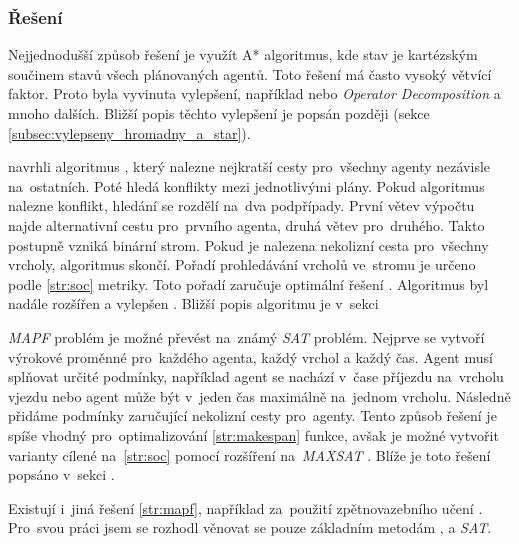 \subsubsection{Řešení~}\label{subsubsec:reseni_offline_mapf}



Nejjednodušší způsob řešení je využít A* algoritmus, kde stav je kartézským součinem stavů všech plánovaných agentů.
Toto řešení má často vysoký větvící faktor.
Proto byla vyvinuta vylepšení, například  nebo
\emph{Operator Decomposition} \citep{Standley_2010} a mnoho dalších.
Bližší popis těchto vylepšení je popsán později (sekce \ref{subsec:vylepseny_hromadny_a_star}).

\citet*{Sharon} navrhli algoritmus ,
který nalezne nejkratší cesty pro~všechny agenty nezávisle na~ostatních.
Poté hledá konflikty mezi jednotlivými plány.
Pokud algoritmus nalezne konflikt, hledání se rozdělí na~dva podpřípady.
První větev výpočtu najde alternativní cestu pro~prvního agenta, druhá větev pro~druhého.
Takto postupně vzniká binární strom.
Pokud je nalezena nekolizní cesta pro~všechny vrcholy, algoritmus skončí.
Pořadí prohledávání vrcholů ve~stromu je určeno podle \ref{str:soc} metriky.
Toto pořadí zaručuje optimální řešení \citep{Sharon}.
Algoritmus byl nadále rozšířen a vylepšen \citep{Boyarski}.
Bližší popis algoritmu je v~sekci 

\emph{MAPF} problém je možné převést na~známý \emph{SAT} problém.  %
Nejprve se vytvoří výrokové proměnné pro~každého agenta, každý vrchol a každý čas.
Agent musí splňovat určité podmínky, například agent se nachází v~čase příjezdu na~vrcholu vjezdu
nebo agent může být v~jeden čas maximálně na~jednom vrcholu.
Následně přidáme podmínky zaručující nekolizní cesty pro~agenty.
Tento způsob řešení je spíše vhodný pro~optimalizování \ref{str:makespan} funkce,
avšak je možné vytvořit varianty cílené na~\ref{str:soc} pomocí rozšíření na~\emph{MAXSAT} \citep{bartak}.
Blíže je toto řešení popsáno v~sekci .

Existují i~jiná řešení \ref{str:mapf}, například za~použití zpětnovazebního učení \citep*{Zhiyao}.
Pro~svou práci jsem se rozhodl věnovat se pouze základním metodám
,  a \emph{SAT}. %

